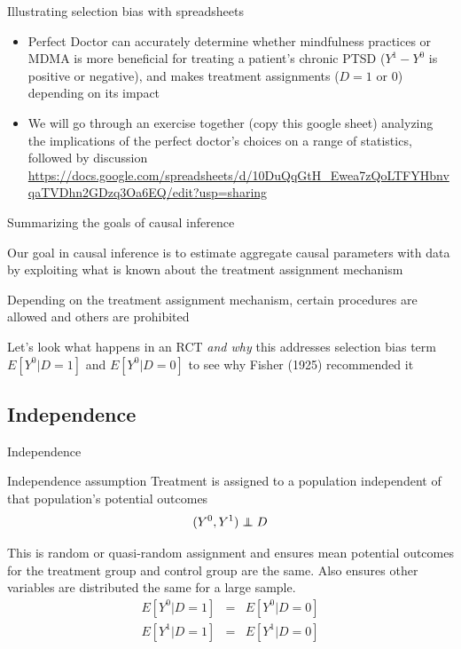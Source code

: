 \documentclass{beamer}
\newcommand\independent{\protect\mathpalette{\protect\independenT}{\perp}}
\def\independenT#1#2{\mathrel{\rlap{$#1#2$}\mkern2mu{#1#2}}}
\begin{document}
\begin{frame}{Illustrating selection bias with spreadsheets}
\begin{itemize}
\item Perfect Doctor can accurately determine whether mindfulness practices or MDMA is more beneficial for treating a patient's chronic PTSD ($Y^1 - Y^0$ is positive or negative), and makes treatment assignments ($D=1$ or $0$) depending on its impact
\item We will go through an exercise together (copy this google sheet) analyzing the implications of the perfect doctor's choices on a range of statistics, followed by discussion \url{https://docs.google.com/spreadsheets/d/10DuQqGtH_Ewea7zQoLTFYHbnvqaTVDhn2GDzq3Oa6EQ/edit?usp=sharing}
\end{itemize}
\end{frame}


\begin{frame}{Summarizing the goals of causal inference}

  Our goal in causal inference is to estimate aggregate causal parameters with data by exploiting what is known about the treatment assignment mechanism

  \bigskip

Depending on the treatment assignment mechanism, certain procedures are allowed and others are prohibited

  \bigskip

  Let's look what happens in an RCT \emph{and why} this addresses selection bias term $E[Y^0|D=1]$ and $E[Y^0|D=0]$ to see why Fisher (1925) recommended it

\end{frame}



\subsection{Independence}


\begin{frame}{Independence}


  \begin{block}{Independence assumption}
    Treatment is assigned to a population independent of that population's potential outcomes  $$(Y^0,Y^1)\independent{D}$$
  \end{block}
  This is random or quasi-random assignment and ensures mean potential outcomes for the treatment group and control group are the same.  Also ensures other variables are distributed the same for a large sample.
  \begin{eqnarray*}
    E[Y^0|D=1] &=& E[Y^0 | D=0] \\
    E[Y^1|D=1] &=& E[Y^1 | D=0]
  \end{eqnarray*}
\end{frame}
\end{document}
